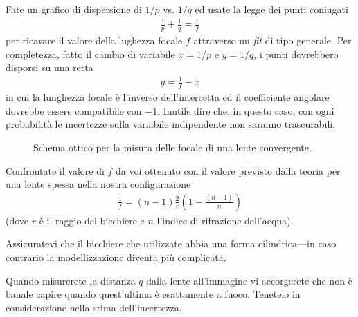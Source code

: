 \documentclass{lab1-article}
\begin{document}
\begin{article}
Fate un grafico di dispersione di $1/p$ vs. $1/q$ ed usate la legge dei punti
coniugati
\begin{align}
  \frac{1}{p} + \frac{1}{q} = \frac{1}{f}
\end{align}
per ricavare il valore della lughezza focale $f$ attraverso un \emph{fit} di tipo
generale. Per completezza, fatto il cambio di variabile $x = 1/p$ e $y = 1/q$,
i punti dovrebbero disporsi su una retta
\begin{align*}
  y = \frac{1}{f} - x
\end{align*}
in cui la lunghezza focale \`e l'inverso dell'intercetta ed il coefficiente
angolare dovrebbe essere compatibile con $-1$. Inutile dire che, in questo caso,
con ogni probabilit\`a le incertezze sulla variabile indipendente non saranno
trascurabili.

\begin{figure}[htb!]
\begin{center}
  \caption{Schema ottico per la misura delle focale di una lente convergente.}
  \label{fig:convergente}
\end{center}
\end{figure}


Confrontate il valore di $f$ da voi ottenuto con il valore previsto dalla
teoria per una lente spessa nella nostra configurazione
\begin{align}
  \frac{1}{f} =(n-1) \frac{2}{r} \left(1 - \frac{(n-1)}{n} \right)
\end{align}
(dove $r$ \`e il raggio del bicchiere e $n$ l'indice di rifrazione dell'acqua).


\secconsiderations

Assicuratevi che il bicchiere che utilizzate abbia una forma cilindrica---in caso
contrario la modellizzazione diventa pi\`u complicata.

Quando misurerete la distanza $q$ dalla lente all'immagine vi accorgerete che
non \`e banale capire quando quest'ultima \`e esattamente a fuoco. Tenetelo
in considerazione nella stima dell'incertezza.

\end{article}
\end{document}
